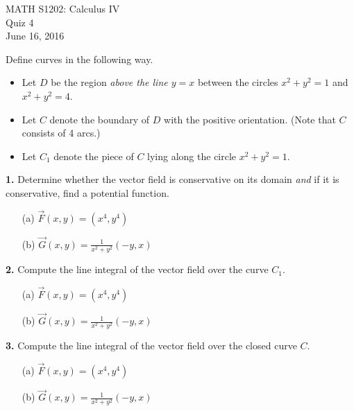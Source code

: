 \documentclass{article}
\begin{document}
\begin{center}
MATH S1202: Calculus IV \\ 
Quiz 4 \\
June 16, 2016
\end{center}

\noindent Define curves in the following way. 
\begin{itemize}
\item Let $D$ be the region \emph{above the line $y=x$} between the circles $x^2 + y^2 =1$ and $x^2 + y^2 = 4$. 
\item Let $C$ denote the boundary of $D$ with the positive orientation. (Note that $C$ consists of 4 arcs.)
\item Let $C_1$ denote the piece of $C$ lying along the circle $x^2 + y^2 = 1$. 
\end{itemize}



\noindent \textbf{1.} Determine whether the vector field is conservative on its domain \emph{and} if it is conservative, find a potential function. 
\begin{enumerate}
\item[(a)] $\vec{F}(x,y) = (x^4, y^4)$
\item[(b)] $\vec{G}(x,y) = \frac{1}{x^2 + y^2}(-y,x)$
\end{enumerate}


\vspace{3mm}

\noindent \textbf{2.} Compute the line integral of the vector field over the curve $C_1$. 
\begin{enumerate}
\item[(a)] $\vec{F}(x,y) = (x^4, y^4)$
\item[(b)] $\vec{G}(x,y) = \frac{1}{x^2 + y^2}(-y,x)$
\end{enumerate}




\vspace{3mm}

\noindent \textbf{3.} Compute the line integral of the vector field over the closed curve $C$. 
\begin{enumerate}
\item[(a)] $\vec{F}(x,y) = (x^4, y^4)$
\item[(b)] $\vec{G}(x,y) = \frac{1}{x^2 + y^2}(-y,x)$
\end{enumerate}

\vspace{3mm}
\end{document}
